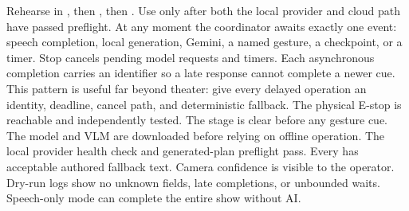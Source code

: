 Rehearse in , then , then .\markdownRendererOlItemEnd 
{}Use  only after both the local provider and cloud path have\markdownRendererSoftLineBreak
{}passed preflight.\markdownRendererOlItemEnd 
\markdownRendererOlEnd \markdownRendererInterblockSeparator
{}
\markdownRendererSectionEnd \markdownRendererSectionBegin
{}\markdownRendererInterblockSeparator
{}At any moment the coordinator awaits exactly one event: speech completion,\markdownRendererSoftLineBreak
{}local generation, Gemini, a named gesture, a checkpoint, or a timer. Stop\markdownRendererSoftLineBreak
{}cancels pending model requests and timers. Each asynchronous completion carries\markdownRendererSoftLineBreak
{}an identifier so a late response cannot complete a newer cue. This pattern is\markdownRendererSoftLineBreak
{}useful far beyond theater: give every delayed operation an identity, deadline,\markdownRendererSoftLineBreak
{}cancel path, and deterministic fallback.\markdownRendererInterblockSeparator
{}
\markdownRendererSectionEnd \markdownRendererSectionBegin
{}\markdownRendererInterblockSeparator
{}\markdownRendererUlBegin
\markdownRendererUlItem The physical E-stop is reachable and independently tested.\markdownRendererUlItemEnd 
\markdownRendererUlItem The stage is clear before any gesture cue.\markdownRendererUlItemEnd 
\markdownRendererUlItem The model and VLM are downloaded before relying on offline operation.\markdownRendererUlItemEnd 
\markdownRendererUlItem The local provider health check and generated-plan preflight pass.\markdownRendererUlItemEnd 
\markdownRendererUlItem Every  has acceptable authored fallback text.\markdownRendererUlItemEnd 
\markdownRendererUlItem Camera confidence is visible to the operator.\markdownRendererUlItemEnd 
\markdownRendererUlItem Dry-run logs show no unknown fields, late completions, or unbounded waits.\markdownRendererUlItemEnd 
\markdownRendererUlItem Speech-only mode can complete the entire show without AI.\markdownRendererUlItemEnd 
\markdownRendererUlEnd \markdownRendererInterblockSeparator
{}\markdownRendererThematicBreak{}\markdownRendererInterblockSeparator
{}
\markdownRendererSectionEnd 
\markdownRendererSectionEnd \markdownRendererSectionBegin
